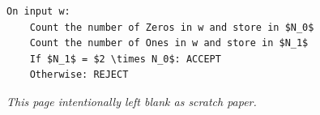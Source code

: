 \documentclass[12pt]{article}
\newenvironment{solution}[1][Solution:]{\begin{trivlist}
\item[\hskip \labelsep {\bfseries #1}\hskip \labelsep {\bfseries}]\color{blue}}{\end{trivlist}}
\begin{document}
\begin{solution}
\;

\begin{lstlisting}[mathescape=true]
On input w:
    Count the number of Zeros in w and store in $N_0$
    Count the number of Ones in w and store in $N_1$
    If $N_1$ = $2 \times N_0$: ACCEPT            
    Otherwise: REJECT
\end{lstlisting}    
\end{solution}

\clearpage
\begin{center}
\vspace{-3em}
\textit{This page intentionally left blank as scratch paper.}
\end{center}


 
\end{document}
